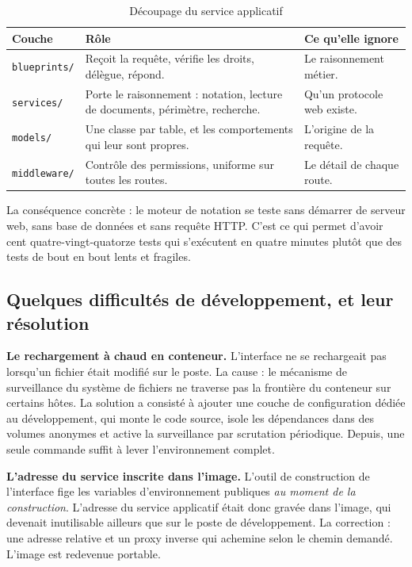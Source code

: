 \documentclass[12pt,a4paper]{report}
\begin{document}
\begin{table}[H]
\centering
\caption{Découpage du service applicatif}
\label{tab:couches}
\begin{tabular}{@{}p{2.9cm}p{4.0cm}p{6.6cm}@{}}
\toprule
\textbf{Couche} & \textbf{Rôle} & \textbf{Ce qu'elle ignore} \\
\midrule
\texttt{blueprints/} & Reçoit la requête, vérifie les droits, délègue,
  répond. & Le raisonnement métier. \\
\texttt{services/} & Porte le raisonnement : notation, lecture de documents,
  périmètre, recherche. & Qu'un protocole web existe. \\
\texttt{models/} & Une classe par table, et les comportements qui leur sont
  propres. & L'origine de la requête. \\
\texttt{middleware/} & Contrôle des permissions, uniforme sur toutes les
  routes. & Le détail de chaque route. \\
\bottomrule
\end{tabular}
\end{table}

La conséquence concrète : le moteur de notation se teste sans démarrer de
serveur web, sans base de données et sans requête HTTP. C'est ce qui permet
d'avoir cent quatre-vingt-quatorze tests qui s'exécutent en quatre minutes
plutôt que des tests de bout en bout lents et fragiles.

\subsection{Quelques difficultés de développement, et leur résolution}

\textbf{Le rechargement à chaud en conteneur.} L'interface ne se rechargeait
pas lorsqu'un fichier était modifié sur le poste. La cause : le mécanisme de
surveillance du système de fichiers ne traverse pas la frontière du conteneur
sur certains hôtes. La solution a consisté à ajouter une couche de
configuration dédiée au développement, qui monte le code source, isole les
dépendances dans des volumes anonymes et active la surveillance par scrutation
périodique. Depuis, une seule commande suffit à lever l'environnement complet.

\textbf{L'adresse du service inscrite dans l'image.} L'outil de construction
de l'interface fige les variables d'environnement publiques \emph{au moment de
la construction}. L'adresse du service applicatif était donc gravée dans
l'image, qui devenait inutilisable ailleurs que sur le poste de développement.
La correction : une adresse relative et un proxy inverse qui achemine selon le
chemin demandé. L'image est redevenue portable.
\end{document}
